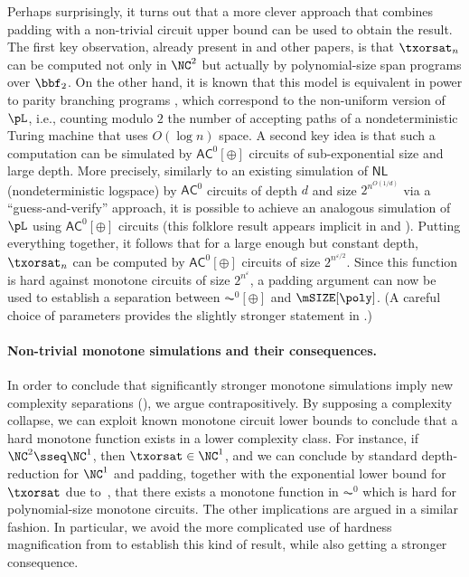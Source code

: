 \documentclass[11pt]{article}
\begin{document}
Perhaps surprisingly, it turns out that a more clever approach that combines padding with a non-trivial circuit upper bound can be used to obtain the result. The first key observation, already present in \citep{gkrs19} and other papers, is that $\txorsat_n$ can be computed not only in $\NC^2$ but actually by polynomial-size span programs over $\bbf_2$. On the other hand, it is known that this model is equivalent in power to parity branching programs \citep{DBLP:conf/coco/KarchmerW93}, which correspond to the non-uniform version of $\pL$, i.e., counting modulo $2$ the number of accepting paths of a nondeterministic Turing machine that uses $O(\log n)$ space. A second key idea is that such a computation can be simulated by $\mathsf{AC}^0[\oplus]$ circuits of sub-exponential size and large depth. More precisely, similarly to an existing simulation of $\mathsf{NL}$ (nondeterministic logspace) by $\mathsf{AC}^0$ circuits of depth $d$ and size $2^{n^{O(1/d)}}$ via a ``guess-and-verify'' approach, it is possible to achieve an analogous simulation of $\pL$ using $\mathsf{AC}^0[\oplus]$ circuits (this folklore result appears implicit in \cite{AKRRV01} and \cite{DBLP:conf/coco/OliveiraS019}). Putting everything together, it follows that for a large enough but constant depth, $\txorsat_n$ can be computed by $\mathsf{AC}^0[\oplus]$ circuits of size $2^{n^{\varepsilon/2}}$. Since this function is hard against monotone circuits of size $2^{n^{\varepsilon}}$, a padding argument can now be used to establish a separation between $\AC^0[\oplus]$ and $\mSIZE[\poly]$. (A careful choice of parameters provides the slightly stronger statement in .)












\paragraph{Non-trivial monotone simulations and their consequences.}


In order to conclude that
significantly stronger monotone simulations imply
new complexity separations (), we argue contrapositively.
By supposing a complexity collapse,
we can
exploit known monotone circuit lower bounds
to conclude that a hard monotone function exists
in a lower complexity class.
For instance, if $\NC^2 \sseq \NC^1$, then
$\txorsat \in \NC^1$,
and we can conclude by standard depth-reduction for $\NC^1$ and padding,
together with the exponential lower bound for $\txorsat$ due
to~\cite{gkrs19},
that there exists a monotone function in $\AC^0$
which is hard for polynomial-size monotone circuits.
The other implications are argued in a similar fashion. In particular, we avoid the more complicated use of hardness magnification from \citep{choprs20} to establish this kind of result, while also getting a stronger consequence.
\end{document}
